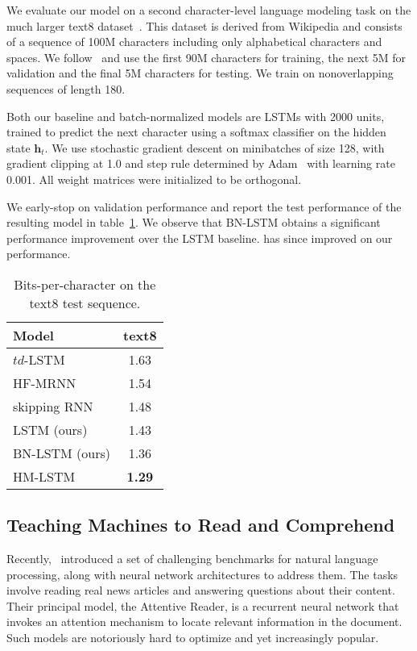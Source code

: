 \documentclass{article} \pdfoutput=1 \usepackage[utf8]{inputenc}
\newcommand{\vect}[1]{\mathbf{#1}}
\begin{document}
We evaluate our model on a second character-level language modeling task on the
much larger text8 dataset~\citep{mahoney2009large}.  This dataset is derived
from Wikipedia and consists of a sequence of 100M characters including only
alphabetical characters and spaces.  We
follow~\citet{mikolov2012subword,zhang2016architectural} and use the first 90M
characters for training, the next 5M for validation and the final 5M characters
for testing.  We train on nonoverlapping sequences of length 180.

Both our baseline and batch-normalized models are LSTMs with 2000 units,
trained to predict the next character using a softmax classifier on the hidden
state $\vect{h}_t$. We use stochastic gradient descent on minibatches of size
128, with gradient clipping at 1.0 and step rule determined by
Adam~\citep{kingma2014adam} with learning rate 0.001.  All weight matrices were
initialized to be orthogonal.

We early-stop on validation performance and report the test performance of the
resulting model in table~\ref{tab:text8_test}.  We observe that BN-LSTM obtains
a significant performance improvement over the LSTM baseline.
\citet{chung2016hierarchical} has since improved on our performance.

\begin{table}[!hb]
  \center
  \begin{tabular}{@{}lc@{}}
  \toprule
  \bf Model & \bf text8 \\
  \midrule
  $td$-LSTM~\citep{zhang2016architectural} & 1.63 \\
  HF-MRNN~\citep{mikolov2012subword} & 1.54 \\
  skipping RNN~\citep{pachitariu2013regularization} & 1.48 \\
  \midrule
  LSTM (ours) &  1.43 \\
  BN-LSTM (ours) & 1.36 \\
  \midrule
  HM-LSTM~\citep{chung2016hierarchical} & \textbf{1.29} \\
  \bottomrule
\end{tabular}
\caption{Bits-per-character on the text8 test sequence.}
\label{tab:text8_test}
\end{table}

\subsection{Teaching Machines to Read and Comprehend}
\label{sec:less-attr}

Recently,~\citet{attentivereader} introduced a set of challenging benchmarks
for natural language processing, along with neural network architectures to
address them.  The tasks involve reading real news articles and answering
questions about their content.  Their principal model, the Attentive Reader, is
a recurrent neural network that invokes an attention mechanism to locate
relevant information in the document.  Such models are notoriously hard to
optimize and yet increasingly popular.
\end{document}
